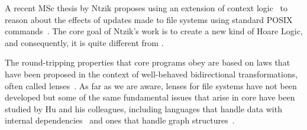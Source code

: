 A recent MSc thesis by Ntzik proposes using an extension of context
logic~\cite{context-logic} to reason about the effects of updates made
to file systems using standard POSIX commands~\cite{ntzik-msc}.  The
core goal of Ntzik's work is to create a new kind of Hoare Logic, and
consequently, it is quite different from \forest{}.  

The round-tripping properties that core \forest{} programs obey are
based on laws that have been proposed in the context of well-behaved
bidirectional transformations, often called lenses~\cite{lenses}. As
far as we are aware, lenses for file systems have not been developed
but some of the same fundamental issues that arise in core \forest{}
have been studied by Hu and his colleagues, including languages that
handle data with internal dependencies~\cite{MuAlgebraic2004} and ones
that handle graph structures~\cite{hidaka-graphs}.

